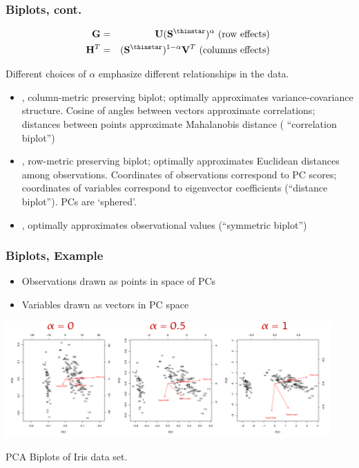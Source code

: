 \documentclass{beamer}
\begin{document}
\begin{frame}
  \frametitle{Biplots, cont.}

\begin{eqnarray*}
\Mtx{G} &=& \Mtx{U}(\Mtx{S}^{\thinstar})^{\alpha} \text{ (row effects) } \\
\Mtx{H}^T &=& (\Mtx{S}^{\thinstar})^{1-\alpha} \Mtx{V}^T \text{ (columns effects) }
\end{eqnarray*}

Different choices of $\alpha$ emphasize different relationships in the data.

\begin{itemize}
\item {}, column-metric preserving biplot; optimally approximates variance-covariance structure. Cosine of angles between vectors approximate correlations; distances between points approximate Mahalanobis distance ( ``correlation biplot'')
\item {}, row-metric preserving biplot; optimally approximates Euclidean distances among observations. Coordinates of observations correspond to PC scores; coordinates of variables correspond to eigenvector coefficients (``distance biplot''). PCs are `sphered'.
\item {},  optimally approximates observational values (``symmetric biplot'')
\end{itemize}

\end{frame}


\begin{frame}
  \frametitle{Biplots, Example}

\begin{itemize}
\item Observations drawn as points in space of PCs
\item Variables drawn as vectors in PC space
\end{itemize}

\medskip

\centerline{
\includegraphics[height=1.75in]{fig-irisbiplots.pdf}
}
\begin{center}
PCA Biplots of Iris data set.
\end{center}

\end{frame}
\end{document}
